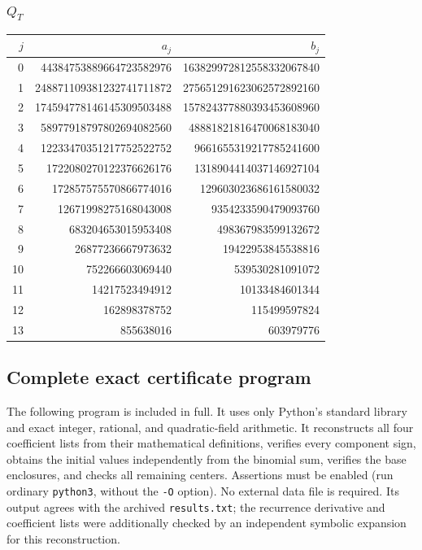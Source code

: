 \documentclass[11pt,a4paper]{article}
\begin{document}
\subsubsection*{$Q_T$}
{\small
\begin{longtable}{rrr}
\toprule
$j$ & $a_j$ & $b_j$\\\midrule
\endhead
0 & 44384753889664723582976 & 163829972812558332067840\\
1 & 248871109381232741711872 & 275651291623062572892160\\
2 & 174594778146145309503488 & 157824377880393453608960\\
3 & 58977918797802694082560 & 48881821816470068183040\\
4 & 12233470351217752522752 & 9661655319217785241600\\
5 & 1722080270122376626176 & 1318904414037146927104\\
6 & 172857575570866774016 & 129603023686161580032\\
7 & 12671998275168043008 & 9354233590479093760\\
8 & 683204653015953408 & 498367983599132672\\
9 & 26877236667973632 & 19422953845538816\\
10 & 752266603069440 & 539530281091072\\
11 & 14217523494912 & 10133484601344\\
12 & 162898378752 & 115499597824\\
13 & 855638016 & 603979776\\
\bottomrule
\end{longtable}
}

\subsection{Complete exact certificate program}\label{R17R:bys:code}
The following program is included in full. It uses only Python's
standard library and exact integer, rational, and quadratic-field
arithmetic. It reconstructs all four coefficient lists from their
mathematical definitions, verifies every component sign, obtains the
initial values independently from the binomial sum, verifies the
base enclosures, and checks all remaining centers. Assertions must be
enabled (run ordinary \texttt{python3}, without the \texttt{-O} option).
No external data file is required. Its output agrees with the archived
\texttt{results.txt}; the recurrence derivative and coefficient lists
were additionally checked by an independent symbolic expansion for
this reconstruction.
\end{document}

